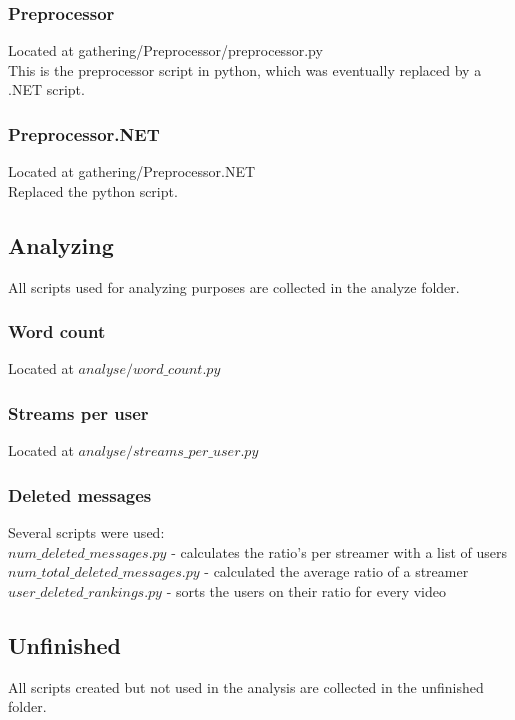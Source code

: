 \documentclass[final]{report} %
\begin{document}
\begin{appendices}
\subsubsection{Preprocessor}
\label{script:preprocessor}
Located at gathering/Preprocessor/preprocessor.py\\
This is the preprocessor script in python, which was eventually replaced by a .NET script.

\subsubsection{Preprocessor.NET}
\label{script:preprocessor.NET}
Located at gathering/Preprocessor.NET\\
Replaced the python script.

\subsection{Analyzing}
All scripts used for analyzing purposes are collected in the analyze folder.
\subsubsection{Word count}
\label{script:word_count}
Located at $analyse/word\_count.py$\\

\subsubsection{Streams per user}
\label{script:streams_per_user}
Located at $analyse/streams\_per\_user.py$\\

\subsubsection{Deleted messages}
\label{script:deleted_messages}
Several scripts were used:\\
$num\_deleted\_messages.py$ - calculates the ratio's per streamer with a list of users\\
$num\_total\_deleted\_messages.py$ - calculated the average ratio of a streamer\\
$user\_deleted\_rankings.py$ - sorts the users on their ratio for every video\\

\subsection{Unfinished}
All scripts created but not used in the analysis are collected in the unfinished folder.


\end{appendices}
\end{document}
